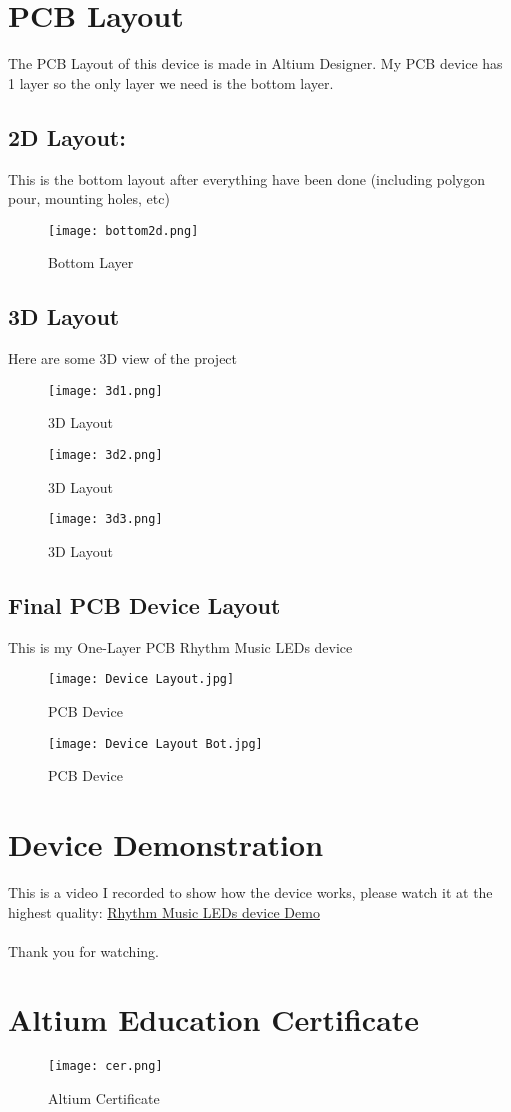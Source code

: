 \documentclass[a4paper]{article}
\numberwithin{figure}{section}
\begin{document}
\section{PCB Layout}
The PCB Layout of this device is made in Altium Designer. My PCB device has 1 layer so the only layer we need is the bottom layer.
\subsection{2D Layout:}
This is the bottom layout after everything have been done (including polygon pour, mounting holes, etc)
\begin{figure}[H]
    \centering
    \texttt{[image: bottom2d.png]}
    \caption{Bottom Layer}
\end{figure}
\newpage
\subsection{3D Layout}
Here are some 3D view of the project
\begin{figure}[H]
    \centering
    \texttt{[image: 3d1.png]}
    \caption{3D Layout}
\end{figure}
\begin{figure}[H]
    \centering
    \texttt{[image: 3d2.png]}
    \caption{3D Layout}
\end{figure}
\begin{figure}[H]
    \centering
    \texttt{[image: 3d3.png]}
    \caption{3D Layout}
\end{figure}
\subsection{Final PCB Device Layout}
This is my One-Layer PCB Rhythm Music LEDs device
\begin{figure}[H]
    \centering
    \texttt{[image: Device Layout.jpg]}
    \caption{PCB Device}
\end{figure}
\begin{figure}[H]
    \centering
    \texttt{[image: Device Layout Bot.jpg]}
    \caption{PCB Device}
\end{figure}
\section{Device Demonstration}
This is a video I recorded to show how the device works, please watch it at the highest quality: \href{https://www.youtube.com/watch?v=cwNKPTRDnqY}{Rhythm Music LEDs device Demo}
\\ \\
Thank you for watching.
\section{Altium Education Certificate}
\begin{figure}[H]
    \centering
    \texttt{[image: cer.png]}
    \caption{Altium Certificate}
\end{figure}
\end{document}

